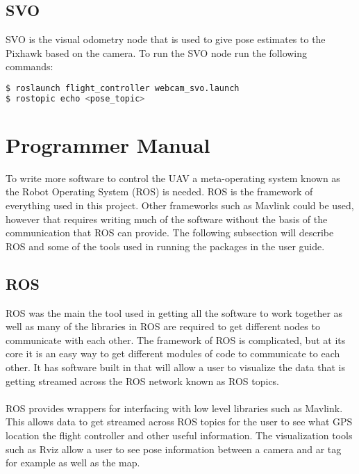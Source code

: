 \subsection{SVO}
SVO is the visual odometry node that is used to give pose estimates to the Pixhawk based on the camera. To run the SVO node run the following commands:
\begin{lstlisting}[language=bash]
$ roslaunch flight_controller webcam_svo.launch
$ rostopic echo <pose_topic>
\end{lstlisting}
\section{Programmer Manual}
To write more software to control the UAV a meta-operating system known as the Robot Operating System (ROS) is needed. ROS is the framework of everything used in this project. Other frameworks such as Mavlink could be used, however that requires writing much of the software without the basis of the communication that ROS can provide. The following subsection will describe ROS and some of the tools used in running the packages in the user guide.
\subsection{ROS}
ROS was the main the tool used in getting all the software to work together as well as many of the libraries in ROS are required to get different nodes to communicate with each other. The framework of ROS is complicated, but at its core it is an easy way to get different modules of code to communicate to each other. It has software built in that will allow a user to visualize the data that is getting streamed across the ROS network known as ROS topics.\\
\\
ROS provides wrappers for interfacing with low level libraries such as Mavlink. This allows data to get streamed across ROS topics for the user to see what GPS location the flight controller and other useful information. The visualization tools such as Rviz allow a user to see pose information between a camera and ar tag for example as well as the map.

